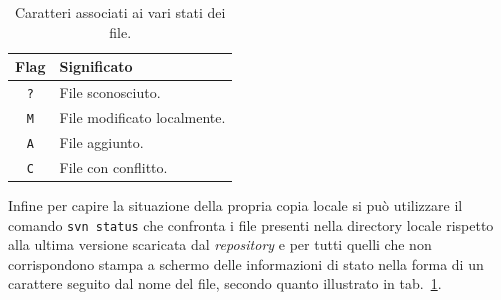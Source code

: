 \begin{table}[htb]
  \centering
  \footnotesize
  \begin{tabular}[c]{|c|l|}
    \hline
    \textbf{Flag} & \textbf{Significato} \\
    \hline
    \hline
    \texttt{?}& File sconosciuto.\\
    \texttt{M}& File modificato localmente.\\
    \texttt{A}& File aggiunto.\\
    \texttt{C}& File con conflitto.\\
    \hline
  \end{tabular}
  \caption{Caratteri associati ai vari stati dei file.}
  \label{tab:svn_status}
\end{table}


Infine per capire la situazione della propria copia locale si può utilizzare
il comando \texttt{svn status} che confronta i file presenti nella directory
locale rispetto alla ultima versione scaricata dal \textit{repository} e per
tutti quelli che non corrispondono stampa a schermo delle informazioni di
stato nella forma di un carattere seguito dal nome del file, secondo quanto
illustrato in tab.~\ref{tab:svn_status}.







